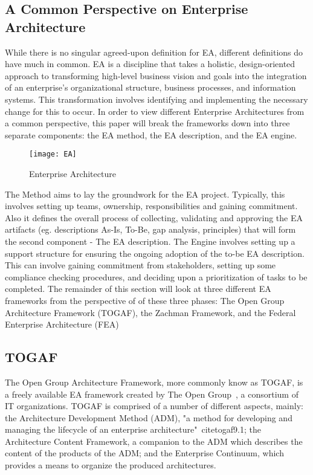 \subsection{A Common Perspective on Enterprise Architecture}
While there is no singular agreed-upon definition for EA, different definitions\cite{jungle2004,GartnerInc,ross2006,pearlson2009,lankhorst2009,sessions2007,togaf9.1} do have much in common. EA is a discipline that takes a holistic, design-oriented approach to transforming high-level business vision and goals into the integration of an enterprise's organizational structure, business processes, and information systems. This transformation involves identifying and implementing the necessary change for this to occur. In order to view different Enterprise Architectures from a common perspective, this paper will break the frameworks down into three separate components: the EA method, the EA description, and the EA engine. 

\begin{figure}
\centering
\texttt{[image: EA]}
\caption{Enterprise Architecture}
\label{fig:EA_general}
\end{figure}

The Method aims to lay the groundwork for the EA project. Typically, this involves setting up teams, ownership, responsibilities and gaining commitment. Also it defines the overall process of collecting, validating and approving the EA artifacts  (eg. descriptions As-Is, To-Be, gap analysis,  principles) that will form the second component - The EA description.  The Engine involves setting up a support structure for ensuring the ongoing adoption of the to-be EA description. This can involve gaining commitment from stakeholders, setting up some compliance checking procedures, and deciding upon a prioritization of tasks to be completed. The remainder of this section will look at three different EA frameworks from the perspective of of these three phases: The Open Group Architecture Framework (TOGAF), the Zachman Framework, and the Federal Enterprise Architecture (FEA)

\subsection{TOGAF}
The Open Group Architecture Framework, more commonly know as TOGAF, is a freely available EA framework created by The Open Group~\cite{togaf9.1}, a consortium of IT organizations. TOGAF is comprised of a number of different aspects, mainly: the Architecture Development Method (ADM), "a method for developing and managing the lifecycle of an enterprise architecture"~cite{togaf9.1}; the Architecture Content Framework, a companion to the ADM which describes the content of the products of the ADM; and the Enterprise Continuum, which provides a means to organize the produced architectures. 
